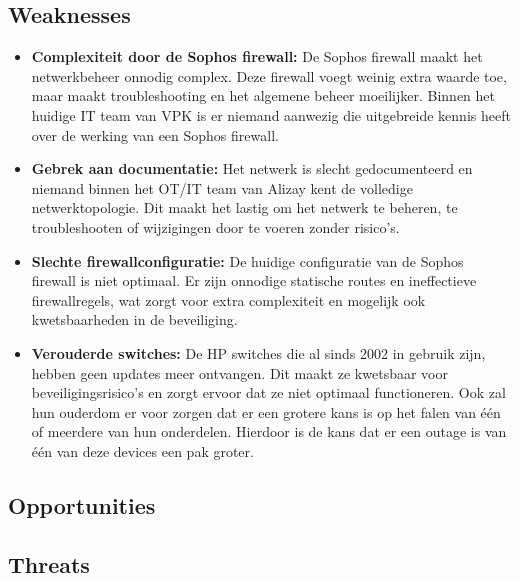\subsection{Weaknesses}

\begin{itemize}
\item \textbf{Complexiteit door de Sophos firewall:} De Sophos firewall maakt het netwerkbeheer onnodig complex. Deze firewall voegt weinig extra waarde toe, maar maakt troubleshooting en het algemene beheer moeilijker. Binnen het huidige IT team van VPK is er niemand aanwezig die uitgebreide kennis heeft over de werking van een Sophos firewall.

\item \textbf{Gebrek aan documentatie:} Het netwerk is slecht gedocumenteerd en niemand binnen het OT/IT team van Alizay kent de volledige netwerktopologie. Dit maakt het lastig om het netwerk te beheren, te troubleshooten of wijzigingen door te voeren zonder risico’s.

\item \textbf{Slechte firewallconfiguratie:} De huidige configuratie van de Sophos firewall is niet optimaal. Er zijn onnodige statische routes en ineffectieve firewallregels, wat zorgt voor extra complexiteit en mogelijk ook kwetsbaarheden in de beveiliging.

\item \textbf{Verouderde switches:} De HP switches die al sinds 2002 in gebruik zijn, hebben geen updates meer ontvangen. Dit maakt ze kwetsbaar voor beveiligingsrisico’s en zorgt ervoor dat ze niet optimaal functioneren. Ook zal hun ouderdom er voor zorgen dat er een grotere kans is op het falen van één of meerdere van hun onderdelen. Hierdoor is de kans dat er een outage is van één van deze devices een pak groter. 
\end{itemize}
    
\subsection{Opportunities}




\subsection{Threats}

